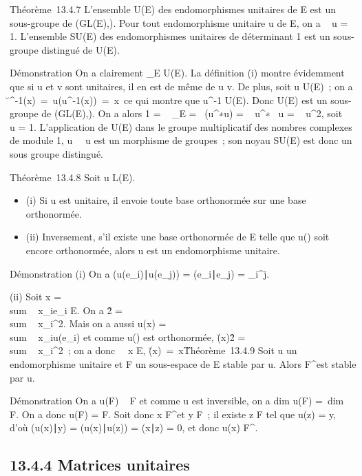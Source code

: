 \documentclass[]{article}
\begin{document}
Théorème~13.4.7 L'ensemble U(E) des endomorphismes unitaires de E est un
sous-groupe de (GL(E),\cdot). Pour tout endomorphisme unitaire u de E, on a
~
u = 1. L'ensemble SU(E) des endomorphismes unitaires de
déterminant 1 est un sous-groupe distingué de U(E).

Démonstration On a clairement \mathrmId_E \in
U(E). La définition (i) montre évidemment que si u et v sont unitaires,
il en est de même de u \cdot v. De plus, soit u \in U(E)~; on a
\u^-1(x)\
=\
u(u^-1(x))\
=\ x\ ce qui montre
que u^-1 \in U(E). Donc U(E) est un sous-groupe de (GL(E),\cdot).
On a alors 1 = ~
\mathrmId_E =\
 (u^∗\cdot u)
= ~
u^∗\mathrm{det}~ u
= ~
u^2, soit
\mathrm{det}~
u = 1. L'application de U(E) dans le groupe multiplicatif des
nombres complexes de module 1,
u\mapsto~\mathrm{det}~
u est un morphisme de groupes~; son noyau SU(E) est donc un sous groupe
distingué.

Théorème~13.4.8 Soit u \in L(E).

\begin{itemize}
\itemsep1pt\parskip0pt
\item
  (i) Si u est unitaire, il envoie toute base orthonormée sur une base
  orthonormée.
\item
  (ii) Inversement, s'il existe une base orthonormée  de E telle que
  u(\mathcal{E}) soit encore orthonormée, alors u est un endomorphisme unitaire.
\end{itemize}

Démonstration (i) On a
(u(e_i)∣u(e_j)) =
(e_i∣e_j) =
\delta_i^j.

(ii) Soit x = \\sum ~
x_ie_i \in E. On a
\x\^2
= \\sum ~
x_i^2. Mais on a aussi u(x)
= \\sum ~
x_iu(e_i) et comme u() est orthonormée,
\u(x)\^2
= \\sum ~
x_i^2~; on a donc
\forall~~x \in E,
\u(x)\
=\ x\.

Théorème~13.4.9 Soit u un endomorphisme unitaire et F un sous-espace de
E stable par u. Alors F^\bot est stable par u.

Démonstration On a u(F) \subset~ F et comme u est inversible, on a
dim u(F) =\ dim~ F. On
a donc u(F) = F. Soit donc x \in F^\bot et y \in F~; il existe z \in F
tel que u(z) = y, d'où (u(x)∣y) =
(u(x)∣u(z)) =
(x∣z) = 0, et donc u(x) \in F^\bot.

\subsection{13.4.4 Matrices unitaires}
\end{document}
